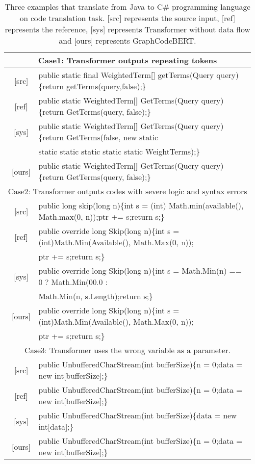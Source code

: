 \documentclass{article} \usepackage{iclr2021_conference,times}
\begin{document}
\begin{table*}[h!]
\small
\begin{center}
\begin{tabular}{c|l}
\toprule 
\multicolumn{2}{c}{Case1: Transformer outputs repeating tokens} \\
\midrule
\ [src] & public static final WeightedTerm[] getTerms(Query query)\{return getTerms(query,false);\} \\
\hline
\ [ref] & public static WeightedTerm[] GetTerms(Query query)\{return GetTerms(query, false);\} \\
\hline
\ [sys] & public static WeightedTerm[] GetTerms(Query query)\{return GetTerms(false, new static  \\ 
& static static static static static WeightTerms);\} \\
\hline
\ [ours] & public static WeightedTerm[] GetTerms(Query query)\{return GetTerms(query, false);\}\\
\midrule
\multicolumn{2}{c}{Case2: Transformer outputs codes with severe logic and syntax errors} \\
\midrule
\ [src] & public long skip(long n)\{int s = (int) Math.min(available(), Math.max(0, n));ptr += s;return s;\} \\
\hline
\ [ref] &public override long Skip(long n)\{int s = (int)Math.Min(Available(), Math.Max(0, n));\\
& ptr += s;return s;\} \\
\hline
\ [sys] &public override long Skip(long n)\{int s = Math.Min(n) == 0 ? Math.Min(00.0 : \\
& Math.Min(n, s.Length);return s;\} \\ 
\hline
\ [ours] &public override long Skip(long n)\{int s = (int)Math.Min(Available(), Math.Max(0, n));\\
& ptr += s;return s;\}\\
\midrule
\multicolumn{2}{c}{Case3: Transformer uses the wrong variable as a parameter.} \\
\midrule
\ [src] & public UnbufferedCharStream(int bufferSize)\{n = 0;data = new int[bufferSize];\} \\
\hline
\ [ref] & public UnbufferedCharStream(int bufferSize)\{n = 0;data = new int[bufferSize];\} \\
\hline
\ [sys] & public UnbufferedCharStream(int bufferSize)\{data = new int[data];\} \\
\hline
\ [ours] & public UnbufferedCharStream(int bufferSize)\{n = 0;data = new int[bufferSize];\} \\
\bottomrule
\end{tabular}
\end{center}
\caption{\label{tab:trans_good_case} Three examples that translate from Java to C\# programming language on code translation task. [src] represents the source input, [ref] represents the reference, [sys] represents Transformer without data flow and [ours] represents GraphCodeBERT.}
\end{table*}
\end{document}
